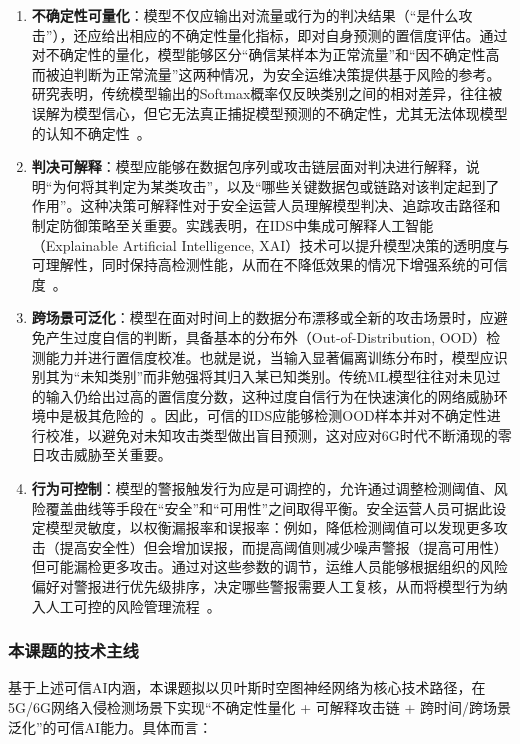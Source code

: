 \begin{enumerate}
  \item \textbf{不确定性可量化}：模型不仅应输出对流量或行为的判决结果（“是什么攻击”），还应给出相应的不确定性量化指标，即对自身预测的置信度评估。通过对不确定性的量化，模型能够区分“确信某样本为正常流量”和“因不确定性高而被迫判断为正常流量”这两种情况，为安全运维决策提供基于风险的参考。研究表明，传统模型输出的Softmax概率仅反映类别之间的相对差异，往往被误解为模型信心，但它无法真正捕捉模型预测的不确定性，尤其无法体现模型的认知不确定性~\cite{Talpini2024}。

  \item \textbf{判决可解释}：模型应能够在数据包序列或攻击链层面对判决进行解释，说明“为何将其判定为某类攻击”，以及“哪些关键数据包或链路对该判定起到了作用”。这种决策可解释性对于安全运营人员理解模型判决、追踪攻击路径和制定防御策略至关重要。实践表明，在IDS中集成可解释人工智能（Explainable Artificial Intelligence, XAI）技术可以提升模型决策的透明度与可理解性，同时保持高检测性能，从而在不降低效果的情况下增强系统的可信度~\cite{Mohale2025}。

  \item \textbf{跨场景可泛化}：模型在面对时间上的数据分布漂移或全新的攻击场景时，应避免产生过度自信的判断，具备基本的分布外（Out-of-Distribution, OOD）检测能力并进行置信度校准。也就是说，当输入显著偏离训练分布时，模型应识别其为“未知类别”而非勉强将其归入某已知类别。传统ML模型往往对未见过的输入仍给出过高的置信度分数，这种过度自信行为在快速演化的网络威胁环境中是极其危险的~\cite{Talpini2024}。因此，可信的IDS应能够检测OOD样本并对不确定性进行校准，以避免对未知攻击类型做出盲目预测，这对应对6G时代不断涌现的零日攻击威胁至关重要。

  \item \textbf{行为可控制}：模型的警报触发行为应是可调控的，允许通过调整检测阈值、风险覆盖曲线等手段在“安全”和“可用性”之间取得平衡。安全运营人员可据此设定模型灵敏度，以权衡漏报率和误报率：例如，降低检测阈值可以发现更多攻击（提高安全性）但会增加误报，而提高阈值则减少噪声警报（提高可用性）但可能漏检更多攻击。通过对这些参数的调节，运维人员能够根据组织的风险偏好对警报进行优先级排序，决定哪些警报需要人工复核，从而将模型行为纳入人工可控的风险管理流程~\cite{Tabarisaadi2024}。
\end{enumerate}

\subsubsection{本课题的技术主线}

基于上述可信AI内涵，本课题拟以贝叶斯时空图神经网络为核心技术路径，在5G/6G网络入侵检测场景下实现``不确定性量化 + 可解释攻击链 + 跨时间/跨场景泛化''的可信AI能力。具体而言：

